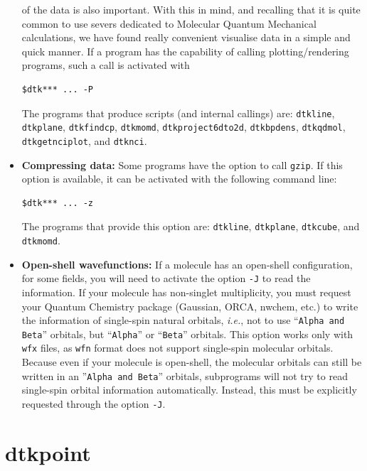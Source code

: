 \begin{itemize}
		of the data is also important. With this in mind, and recalling that it is quite common to use
		severs dedicated to Molecular Quantum Mechanical calculations, we have found really
		convenient visualise data in a simple and quick manner. If a \DTK{} program has
		the capability of calling plotting/rendering programs, such a call is activated with
		\begin{lstlisting}
$dtk*** ... -P
		\end{lstlisting}
	   The programs that produce scripts (and internal callings) are: \texttt{dtkline}, \texttt{dtkplane},
	   \texttt{dtkfindcp}, \texttt{dtkmomd}, \texttt{dtkproject6dto2d}, \texttt{dtkbpdens},
	   \texttt{dtkqdmol}, \texttt{dtkgetnciplot}, and \texttt{dtknci}.
   \item \textbf{Compressing data:} Some programs have the option to call \texttt{gzip}.
   	If this option is available, it can be activated with the following command line:
		\begin{lstlisting}
$dtk*** ... -z
     \end{lstlisting}
     The programs that provide this option are: \texttt{dtkline}, \texttt{dtkplane}, \texttt{dtkcube},
     and \texttt{dtkmomd}.
     \item \textbf{Open-shell wavefunctions:} If a molecule has an open-shell configuration,
    		for some fields, you will need to activate the option \texttt{-J} to read the information.
			If your molecule has non-singlet multiplicity, you must request your Quantum Chemistry
			package (Gaussian, ORCA, nwchem, etc.) to write the information of single-spin natural
			orbitals, \textit{i.e.}, not to use ``\texttt{Alpha and Beta}'' orbitals, but
			``\texttt{Alpha}'' or ``\texttt{Beta}'' orbitals.
		This option works only with \texttt{wfx} files, as \texttt{wfn} format does not support
		single-spin molecular orbitals.
		Because even if your molecule is open-shell, the molecular orbitals can still be written
		in an ''\texttt{Alpha and Beta}'' orbitals, \DTK{} subprograms will not try to read
		single-spin orbital information automatically. Instead, this must be explicitly requested through
		the option \texttt{-J}.
\end{itemize}

\section{dtkpoint}

